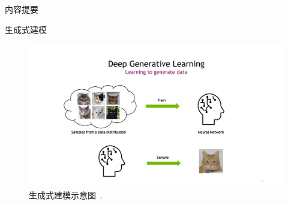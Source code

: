 
\begin{refsection}
  \begin{frame}{内容提要}
  \end{frame}
\end{refsection}

\begin{refsection}
\begin{frame}{生成式建模}
  \begin{figure}
    \centering
    \includegraphics[width=0.8\linewidth]{figs/learning_to_generate_data.png}
    \caption{\scriptsize 生成式建模示意图~\parencite{CVPR2023Tutorial}.}
  \end{figure}
  \bottomleftrefs
\end{frame}
\end{refsection}

